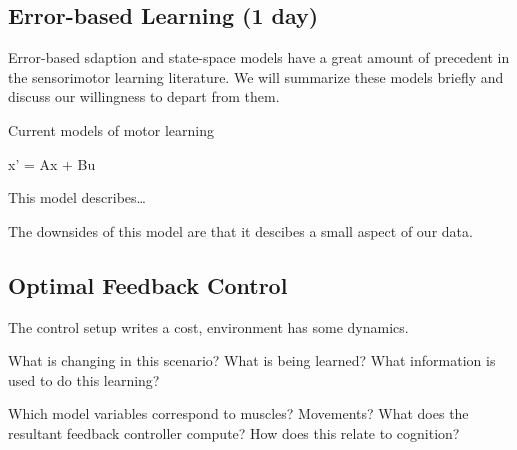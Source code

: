 {            \hypertarget{error-based-learning-1-day}{%
            \subsection{Error-based Learning (1
            day)}\label{error-based-learning-1-day}}

            Error-based sdaption and state-space models have a great
            amount of precedent in the sensorimotor learning literature.
            We will summarize these models briefly and discuss our
            willingness to depart from them.

            Current models of motor learning

            x' = Ax + Bu

            This model describes\ldots{}

            The downsides of this model are that it descibes a small
            aspect of our data.

            \hypertarget{optimal-feedback-control}{%
            \subsection{Optimal Feedback
            Control}\label{optimal-feedback-control}}

            The control setup writes a cost, environment has some
            dynamics.

            What is changing in this scenario? What is being learned?
            What information is used to do this learning?

            Which model variables correspond to muscles? Movements? What
            does the resultant feedback controller compute? How does
            this relate to cognition?

}
